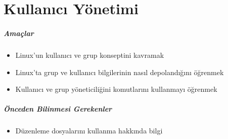 \chapter{Kullanıcı Yönetimi}
\paragraph{Amaçlar}{
\begin{itemize}
 \item Linux'un kullanıcı ve grup konseptini kavramak
 \item Linux'ta grup ve kullanıcı bilgilerinin nasıl depolandığını öğrenmek
 \item Kullanıcı ve grup yöneticiliğini komutlarını kullanmayı öğrenmek
 \end{itemize}}
\paragraph{Önceden Bilinmesi Gerekenler}
\begin{itemize}
 \item Düzenleme dosyalarını kullanma hakkında bilgi
 \end{itemize}

